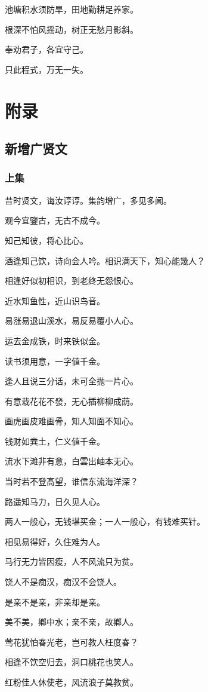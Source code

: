 \documentclass[12pt,oneside]{book}
\begin{document}
池塘积水须防旱，田地勤耕足养家。

根深不怕风摇动，树正无愁月影斜。

奉劝君子，各宜守己。

只此程式，万无一失。  
  
\part{附录}
\chapter{新增广贤文}
\section{上集}
昔时贤文，诲汝谆谆。集韵增广，多见多闻。

观今宜鑒古，无古不成今。

知己知彼，将心比心。

酒逢知己饮，诗向会人吟。相识满天下，知心能幾人？

相逢好似初相识，到老终无怨恨心。

近水知鱼性，近山识鸟音。

易涨易退山溪水，易反易覆小人心。

运去金成铁，时来铁似金。

读书须用意，一字値千金。

逢人且说三分话，未可全抛一片心。

有意栽花花不發，无心插柳柳成荫。

画虎画皮难画骨，知人知面不知心。

钱财如粪土，仁义値千金。

流水下滩非有意，白雲出岫本无心。

当时若不登髙望，谁信东流海洋深？

路遥知马力，日久见人心。

两人一般心，无钱堪买金；一人一般心，有钱难买针。

相见易得好，久住难为人。

马行无力皆因瘦，人不风流只为贫。

饶人不是痴汉，痴汉不会饶人。

是亲不是亲，非亲却是亲。

美不美，鄕中水；亲不亲，故鄕人。

莺花犹怕春光老，岂可教人枉度春？

相逢不饮空归去，洞口桃花也笑人。

红粉佳人休使老，风流浪子莫教贫。
\end{document}
